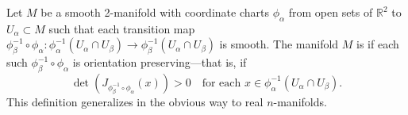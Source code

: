 Let $M$ be a smooth 2-manifold with coordinate charts $\phi_\alpha$ from open sets of $\mathbb{R}^2$ to $U_\alpha \subset M$ such that each transition map $\phi_\beta^{-1} \circ \phi_\alpha: \phi_\alpha^{-1}(U_\alpha \cap U_\beta) \rightarrow \phi_\beta^{-1}(U_\alpha \cap U_\beta)$ is smooth. The manifold $M$ is  if each such $\phi_\beta^{-1} \circ \phi_\alpha$ is orientation preserving---that is, if
$$\det(J_{\phi_\beta^{-1} \circ \phi_\alpha}(x)) > 0 \quad \text{for each } x \in \phi_\alpha^{-1}(U_\alpha \cap U_\beta).$$
This definition generalizes in the obvious way to real $n$-manifolds.
